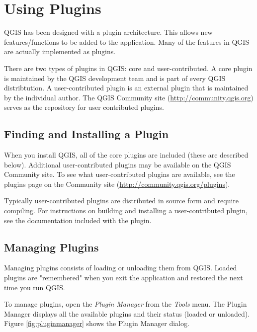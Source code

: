 \section{Using Plugins}
QGIS has been designed with a plugin architecture. This allows new features/functions to be added to the application. Many of the features in QGIS are actually implemented as plugins.

There are two types of plugins in QGIS: core and user-contributed.
A core plugin is maintained by the QGIS development team and is part of every QGIS distribtution. A user-contributed plugin is an external plugin that is maintained by the individual author. The QGIS Community site (\url{http://community.qgis.org}) serves as the repository for user contributed plugins.

\subsection{Finding and Installing a Plugin}
When you install QGIS, all of the core plugins are included (these are described
below). Additional user-contributed plugins may be
available on the QGIS Community site. To see what user-contributed plugins are
available, see the plugins page on the Community site
(\url{http://community.qgis.org/plugins}).

Typically user-contributed plugins are distributed in source form and require compiling. For instructions on building and installing a user-contributed plugin, see the documentation included with the plugin.
\subsection{Managing Plugins}\label{sec:managing_plugins}
Managing plugins consists of loading or unloading them from QGIS. Loaded plugins are "remembered" when you exit the application and restored the next time you run QGIS.

To manage plugins, open the \textsl{Plugin Manager} from the \textsl{Tools}
menu. The Plugin Manager displays all the available plugins and their status (loaded or unloaded). Figure \ref{fig:pluginmanager} shows the Plugin Manager dialog.

